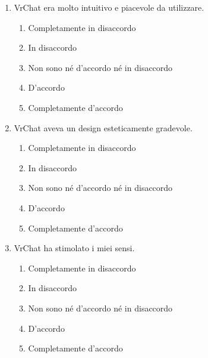 \documentclass{article}
\newcommand{\app}{VrChat \hspace{0.1em}}
\begin{document}
\begin{enumerate}[label=\textbf{Domanda \arabic*.}, resume]
    \item \app era molto intuitivo e piacevole da utilizzare.
    \begin{enumerate}
    \item Completamente in disaccordo
    \item In disaccordo
    \item Non sono né d’accordo né in disaccordo
    \item D’accordo
    \item Completamente d’accordo
\end{enumerate}
    \item \app aveva un design esteticamente gradevole.
    \begin{enumerate}
    \item Completamente in disaccordo
    \item In disaccordo
    \item Non sono né d’accordo né in disaccordo
    \item D’accordo
    \item Completamente d’accordo
\end{enumerate}
    \item \app ha stimolato i miei sensi.
    \begin{enumerate}
    \item Completamente in disaccordo
    \item In disaccordo
    \item Non sono né d’accordo né in disaccordo
    \item D’accordo
    \item Completamente d’accordo
\end{enumerate}
\end{enumerate}
\end{document}
